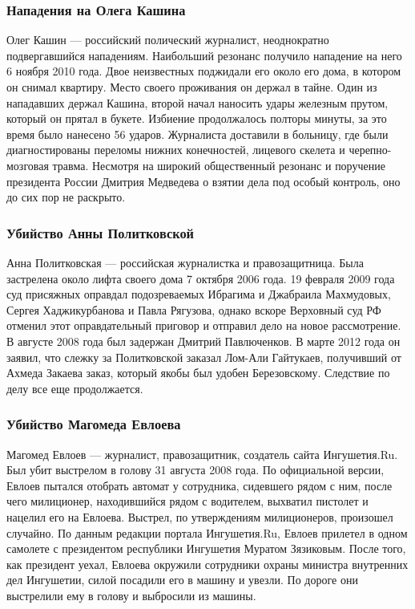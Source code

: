 \subsubsection{Нападения на Олега Кашина}
Олег Кашин --- российский полический журналист, неоднократно подвергавшийся нападениям. Наибольший резонанс получило нападение на него 6 ноября 2010 года. Двое неизвестных поджидали его около его дома, в котором он снимал квартиру. Место своего проживания он держал в тайне. Один из нападавших держал Кашина, второй начал наносить удары железным прутом, который он прятал в букете\cite{kashin_beat}. Избиение продолжалось полторы минуты, за это время было нанесено 56 ударов\cite{kashin_count}. Журналиста доставили в больницу, где были диагностированы переломы нижних конечностей, лицевого скелета и черепно-мозговая травма\cite{kashin_trauma}. Несмотря на широкий общественный резонанс и поручение президента России Дмитрия Медведева о взятии дела под особый контроль\cite{kashin_medvedev}, оно до сих пор не раскрыто.
\subsubsection{Убийство Анны Политковской}
Анна Политковская --- российская журналистка и правозащитница. Была застрелена около лифта своего дома 7 октября 2006 года\cite{politkovskaya_death}. 19 февраля 2009 года суд присяжных оправдал подозреваемых Ибрагима и Джабраила Махмудовых, Сергея Хаджикурбанова и Павла Рягузова\cite{politkovskaya_court1}, однако вскоре Верховный суд РФ отменил этот оправдательный приговор и отправил дело на новое рассмотрение\cite{politkovskaya_court2,politkovskaya_court3}. В августе 2008 года был задержан Дмитрий Павлюченков\cite{politkovskaya_pavluchenkov}. В марте 2012 года он заявил, что слежку за Политковской заказал Лом-Али Гайтукаев, получивший от Ахмеда Закаева заказ, который якобы был удобен Березовскому\cite{politkovskaya_head}. Следствие по делу все еще продолжается.
\subsubsection{Убийство Магомеда Евлоева}
Магомед Евлоев --- журналист, правозащитник, создатель сайта Ингушетия.Ru. Был убит выстрелом в голову 31 августа 2008 года. По официальной версии, Евлоев пытался отобрать автомат у сотрудника, сидевшего рядом с ним, после чего милиционер, находившийся рядом с водителем, выхватил пистолет и нацелил его на Евлоева. Выстрел, по утверждениям милиционеров, произошел случайно\cite{evloev_mvd}. По данным редакции портала Ингушетия.Ru, Евлоев прилетел в одном самолете с президентом республики Ингушетия Муратом Зязиковым. После того, как президент уехал, Евлоева окружили сотрудники охраны министра внутренних дел Ингушетии, силой посадили его в машину и увезли. По дороге они выстрелили ему в голову и выбросили из машины\cite{evloev_death}.
